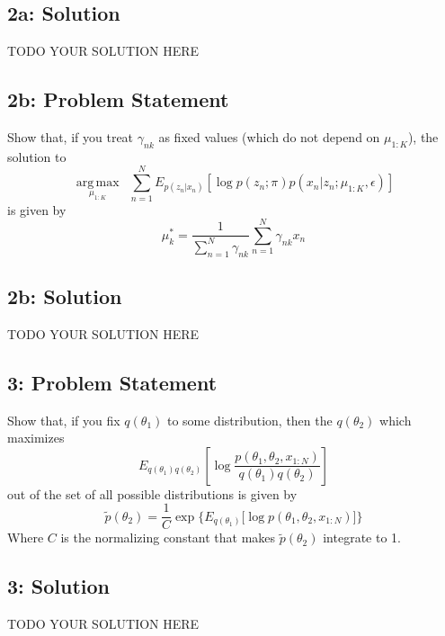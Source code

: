 \documentclass[10pt]{article}
\newcommand{\officialdirections}[1]{{\color{purple} #1}}
\newcommand{\argmax}{\operatorname*{arg\,max}}
\begin{document}
\subsection{2a: Solution}
TODO YOUR SOLUTION HERE

\newpage
\officialdirections{\subsection*{2b: Problem Statement}
Show that, if you treat $\gamma_{nk}$ as fixed values (which do not depend on $\mu_{1:K}$), the solution to 
\begin{equation*}
\argmax_{\mu_{1:K}}\,\,\, \sum_{n=1}^N  E_{p(z_{n}|x_n)}\left[\log p(z_n;\pi)p(x_n|z_n;\mu_{1:K},\epsilon) \right]
\end{equation*}
is given by
\begin{equation*}
\mu_k^* = \frac{1}{\sum_{n=1}^N \gamma_{nk}} \sum_{n=1}^N \gamma_{nk} x_n 
\end{equation*}
}

\subsection{2b: Solution}
TODO YOUR SOLUTION HERE

\newpage
\officialdirections{
\subsection*{3: Problem Statement}
Show that, if you fix $q(\theta_1)$ to some distribution, then the $q(\theta_2)$ which maximizes
\begin{equation*}
E_{q(\theta_1)q(\theta_2)}\left[\log \frac{p(\theta_1,\theta_2,x_{1:N})}{q(\theta_1)q(\theta_2)} \right]
\end{equation*}
out of the set of all possible distributions is given by
\begin{equation*}
\tilde{p}(\theta_2) = \frac{1}{C}\exp\Big\{E_{q(\theta_1)}\big[\log p(\theta_1,\theta_2,x_{1:N})\big]\Big\}
\end{equation*}
Where $C$ is the normalizing constant that makes $\tilde{p}(\theta_2)$ integrate to 1.
}

\subsection{3: Solution}

TODO YOUR SOLUTION HERE
\end{document}
